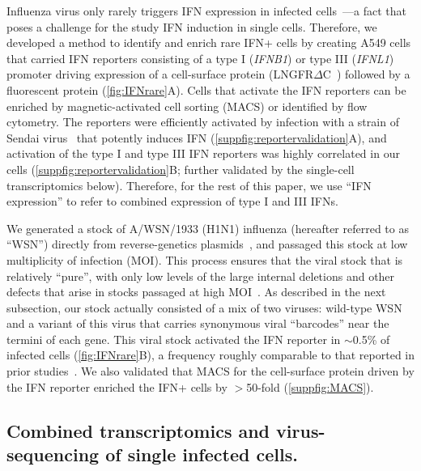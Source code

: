 \documentclass[lineno]{asm-article}
\newcommand{\FIG}[1]{\autoref{fig:#1}}
\newcommand{\SUPPFIG}[1]{\autoref{suppfig:#1}}
\begin{document}
Influenza virus only rarely triggers IFN expression in infected cells~\cite{killip2017single, russell2018extreme, kallfass2013visualizing}---a fact that poses a challenge for the study IFN induction in single cells.
Therefore, we developed a method to identify and enrich rare IFN+ cells by creating A549 cells that carried IFN reporters consisting of a type I (\textit{IFNB1}) or type III (\textit{IFNL1}) promoter driving expression of a cell-surface protein (LNGFR$\Delta$C~\cite{bonini1997hsv,ruggieri1997cell}) followed by a fluorescent protein (\FIG{IFNrare}A).
Cells that activate the IFN reporters can be enriched by magnetic-activated cell sorting (MACS) or identified by flow cytometry.
The reporters were efficiently activated by infection with a strain of Sendai virus~\cite{strahle2006sendai} that potently induces IFN (\SUPPFIG{reportervalidation}A), and activation of the type I and type III IFN reporters was highly correlated in our cells (\SUPPFIG{reportervalidation}B; further validated by the single-cell transcriptomics below).
Therefore, for the rest of this paper, we use ``IFN expression'' to refer to combined expression of type I and III IFNs. 

We generated a stock of A/WSN/1933 (H1N1) influenza (hereafter referred to as ``WSN'') directly from reverse-genetics plasmids~\cite{hoffmann2000dna}, and passaged this stock at low multiplicity of infection (MOI).
This process ensures that the viral stock that is relatively ``pure'', with only low levels of the large internal deletions and other defects that arise in stocks passaged at high MOI~\cite{xue2016propagation}.
As described in the next subsection, our stock actually consisted of a mix of two viruses: wild-type WSN and a variant of this virus that carries synonymous viral ``barcodes'' near the termini of each gene.
This viral stock activated the IFN reporter in $\sim$0.5\% of infected cells  (\FIG{IFNrare}B), a frequency roughly comparable to that reported in prior studies~\cite{killip2017single, russell2018extreme}.
We also validated that MACS for the cell-surface protein driven by the IFN reporter enriched the IFN+ cells by $>$50-fold (\SUPPFIG{MACS}).

\subsection{Combined transcriptomics and virus-sequencing of single infected cells.}
\end{document}
